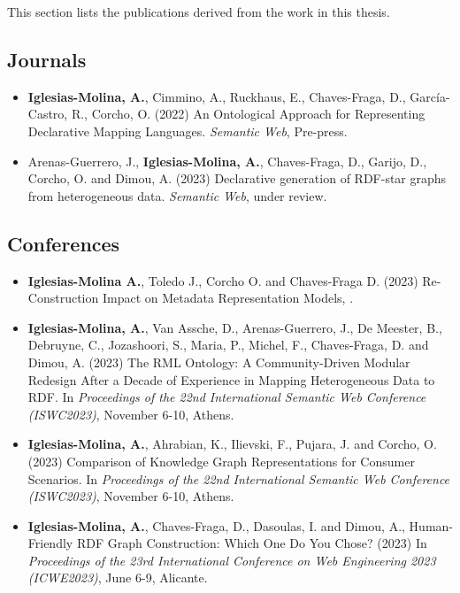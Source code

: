 This section lists the publications derived from the work in this thesis.

\subsection{Journals}

\begin{itemize}
    \item \textbf{Iglesias-Molina, A.}, Cimmino, A., Ruckhaus, E., Chaves-Fraga, D., García-Castro, R., Corcho, O. (2022) An Ontological Approach for Representing Declarative Mapping Languages. \textit{Semantic Web}, Pre-press. 

    \item Arenas-Guerrero, J., \textbf{Iglesias-Molina, A.}, Chaves-Fraga, D., Garijo, D., Corcho, O. and Dimou, A. (2023) Declarative generation of RDF-star graphs from heterogeneous data. \textit{Semantic Web}, under review.
\end{itemize}


\subsection{Conferences}
\begin{itemize}
    \item \textbf{Iglesias-Molina A.}, Toledo J., Corcho O. and Chaves-Fraga D. (2023) Re-Construction Impact on Metadata Representation Models, .

    \item \textbf{Iglesias-Molina, A.}, Van Assche, D., Arenas-Guerrero, J., De Meester, B., Debruyne, C., Jozashoori, S., Maria, P., Michel, F., Chaves-Fraga, D. and Dimou, A. (2023) The RML Ontology: A Community-Driven Modular Redesign After a Decade of Experience in Mapping Heterogeneous Data to RDF. In \textit{Proceedings of the 22nd International Semantic Web Conference (ISWC2023)}, November 6-10, Athens.

    \item \textbf{Iglesias-Molina, A.}, Ahrabian, K., Ilievski, F., Pujara, J. and Corcho, O. (2023) Comparison of Knowledge Graph Representations for Consumer Scenarios. In \textit{Proceedings of the 22nd International Semantic Web Conference (ISWC2023)}, November 6-10, Athens.

    \item \textbf{Iglesias-Molina, A.}, Chaves-Fraga, D., Dasoulas, I. and Dimou, A., Human-Friendly RDF Graph Construction: Which One Do You Chose? (2023) In \textit{Proceedings of the 23rd International Conference on Web Engineering 2023 (ICWE2023)}, June 6-9, Alicante.
\end{itemize}

